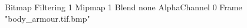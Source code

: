 {Bitmap
	{Filtering 1}
	{Mipmap 1}
	{Blend none}
	{AlphaChannel 0}
	{Frame "body_armour.tif.bmp"}
}
